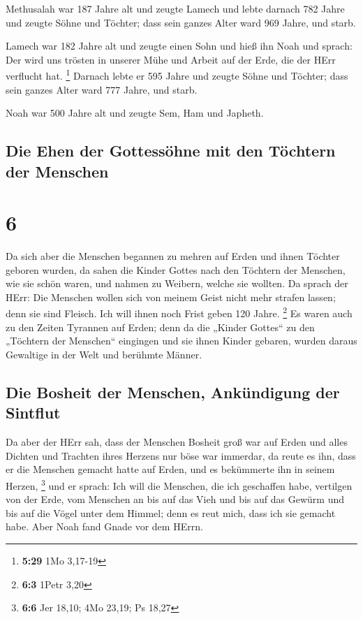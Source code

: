  Methusalah war 187 Jahre alt und zeugte Lamech
 und lebte darnach 782 Jahre und zeugte Söhne und
Töchter;  dass sein ganzes Alter ward 969 Jahre, und
starb.

 Lamech war 182 Jahre alt und zeugte einen Sohn
 und hieß ihn Noah und sprach: Der wird uns trösten in
unserer Mühe und Arbeit auf der Erde, die der HErr verflucht hat.
\footnote{\textbf{5:29} 1Mo 3,17-19}  Darnach lebte er
595 Jahre und zeugte Söhne und Töchter;  dass sein ganzes
Alter ward 777 Jahre, und starb.

 Noah war 500 Jahre alt und zeugte Sem, Ham und Japheth.

\hypertarget{die-ehen-der-gottessuxf6hne-mit-den-tuxf6chtern-der-menschen}{%
\subsection{Die Ehen der Gottessöhne mit den Töchtern der
Menschen}\label{die-ehen-der-gottessuxf6hne-mit-den-tuxf6chtern-der-menschen}}

\hypertarget{section-5}{%
\section{6}\label{section-5}}

 Da sich aber die Menschen begannen zu mehren auf Erden
und ihnen Töchter geboren wurden,  da sahen die Kinder
Gottes nach den Töchtern der Menschen, wie sie schön waren, und nahmen
zu Weibern, welche sie wollten.  Da sprach der HErr: Die
Menschen wollen sich von meinem Geist nicht mehr strafen lassen; denn
sie sind Fleisch. Ich will ihnen noch Frist geben 120 Jahre. \footnote{\textbf{6:3}
  1Petr 3,20}  Es waren auch zu den Zeiten Tyrannen auf
Erden; denn da die „Kinder Gottes`` zu den „Töchtern der Menschen``
eingingen und sie ihnen Kinder gebaren, wurden daraus Gewaltige in der
Welt und berühmte Männer.

\hypertarget{die-bosheit-der-menschen-ankuxfcndigung-der-sintflut}{%
\subsection{Die Bosheit der Menschen, Ankündigung der
Sintflut}\label{die-bosheit-der-menschen-ankuxfcndigung-der-sintflut}}

 Da aber der HErr sah, dass der Menschen Bosheit groß war
auf Erden und alles Dichten und Trachten ihres Herzens nur böse war
immerdar,  da reute es ihn, dass er die Menschen gemacht
hatte auf Erden, und es bekümmerte ihn in seinem Herzen, \footnote{\textbf{6:6}
  Jer 18,10; 4Mo 23,19; Ps 18,27}  und er sprach: Ich will
die Menschen, die ich geschaffen habe, vertilgen von der Erde, vom
Menschen an bis auf das Vieh und bis auf das Gewürm und bis auf die
Vögel unter dem Himmel; denn es reut mich, dass ich sie gemacht habe.
 Aber Noah fand Gnade vor dem HErrn.

